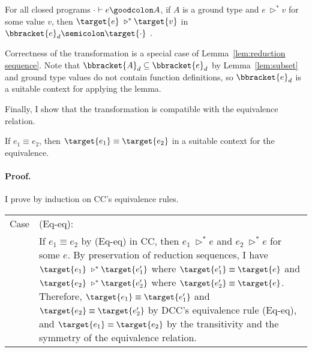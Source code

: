 \begin{coro}[Correctness] For all closed programs $\cdot \vdash e \goodcolon A$, if $A$ is a ground type and $e\ \triangleright^* v$ for some value $v$, then $\target{e}\ \triangleright^* \target{v}$ in $\bbracket{e}_d \semicolon \target{\cdot}$ .
\end{coro}

Correctness of the transformation is a special case of Lemma~\ref{lem:reduction sequence}.
Note that $\bbracket{A}_d \subseteq \bbracket{e}_d$ by Lemma~\ref{lem:subset} and ground type values do not contain function definitions, so $\bbracket{e}_d$ is a suitable context for applying the lemma.

Finally, I show that the transformation is compatible with the equivalence relation.

\begin{lemma}[Coherence] If $e_1 \equiv e_2$, then $\target{e_1} \equiv \target{e_2}$ in a suitable context for the equivalence.
\paragraph{Proof.} I prove by induction on CC's equivalence rules.
\renewcommand{\arraystretch}{1.35}
\begin{longtable}{p{0.05\linewidth} p{0.95\linewidth}}
Case & (Eq-eq): \\
& If $e_1 \equiv e_2$ by (Eq-eq) in CC, then $e_1\ \triangleright^* e$ and $e_2\ \triangleright^* e$ for some $e$. By preservation of reduction sequences, I have $\target{e_1}\ \triangleright^* \target{e_1'}$ where $\target{e_1'} \equiv \target{e}$ and $\target{e_2}\ \triangleright^* \target{e_2'}$ where $\target{e_2'} \equiv \target{e}$. 
Therefore, $\target{e_1} \equiv \target{e_1'}$ and $\target{e_2} \equiv \target{e_2'}$ by DCC's equivalence rule (Eq-eq), and $\target{e_1} \equiv \target{e_2}$ by the transitivity and the symmetry of the equivalence relation.
\\


\end{longtable}
\end{lemma}
